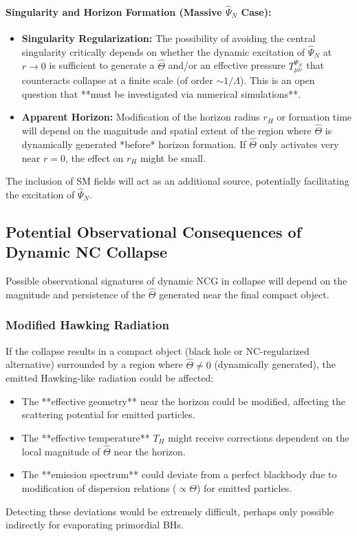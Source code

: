 \documentclass[11pt, a4paper]{article}
\theoremstyle{remark}
\newcommand{\Op}[1]{\hat{#1}}
\begin{document}
\paragraph{Singularity and Horizon Formation (Massive \( \Op{\Psi}_N \) Case):}
\begin{itemize}
    \item \textbf{Singularity Regularization:} The possibility of avoiding the central singularity critically depends on whether the dynamic excitation of \( \Op{\Psi}_N \) at \( r \to 0 \) is sufficient to generate a \( \Op{\Theta} \) and/or an effective pressure \( T_{\mu\nu}^{\Psi_N} \) that counteracts collapse at a finite scale (of order \( \sim 1/\Lambda \)). This is an open question that **must be investigated via numerical simulations**.
    \item \textbf{Apparent Horizon:} Modification of the horizon radius \( r_H \) or formation time will depend on the magnitude and spatial extent of the region where \( \Op{\Theta} \) is dynamically generated *before* horizon formation. If \( \Op{\Theta} \) only activates very near \( r=0 \), the effect on \( r_H \) might be small.
\end{itemize}
The inclusion of SM fields will act as an additional source, potentially facilitating the excitation of \( \Op{\Psi}_N \).

\subsection{Potential Observational Consequences of Dynamic NC Collapse}
\label{subsec:collapse_observables}

Possible observational signatures of dynamic NCG in collapse will depend on the magnitude and persistence of the \( \Op{\Theta} \) generated near the final compact object.

\subsubsection{Modified Hawking Radiation}
\label{ssubsec:nc_hawking}
If the collapse results in a compact object (black hole or NC-regularized alternative) surrounded by a region where \( \Op{\Theta} \neq 0 \) (dynamically generated), the emitted Hawking-like radiation could be affected:
\begin{itemize}
    \item The **effective geometry** near the horizon could be modified, affecting the scattering potential for emitted particles.
    \item The **effective temperature** \( T_H \) might receive corrections dependent on the local magnitude of \( \Op{\Theta} \) near the horizon.
    \item The **emission spectrum** could deviate from a perfect blackbody due to modification of dispersion relations (\( \propto \Theta \)) for emitted particles.
\end{itemize}
Detecting these deviations would be extremely difficult, perhaps only possible indirectly for evaporating primordial BHs.
\end{document}
